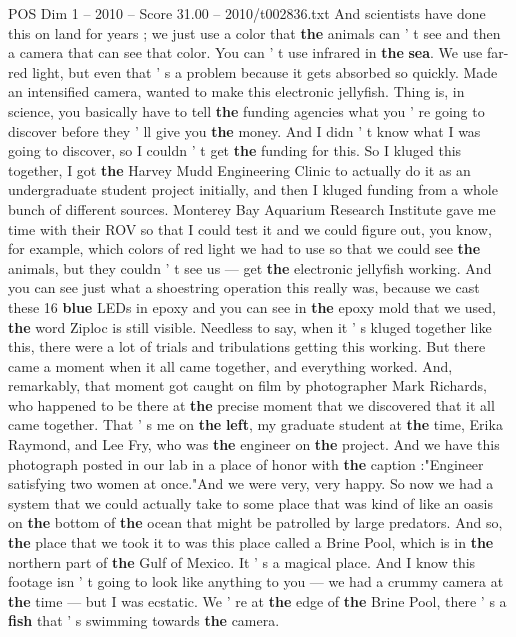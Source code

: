 \begin{textsample}{POS Dim 1 – 2010 – Score 31.00 – 2010/t002836.txt}
And scientists have done this on land for years ; we just use a color that \textbf{the} animals can ' t see and then a camera that can see that color.
You can ' t use infrared in \textbf{the} \textbf{sea}.
We use far-red light, but even that ' s a problem because it gets absorbed so quickly.
Made an intensified camera, wanted to make this electronic jellyfish.
Thing is, in science, you basically have to tell \textbf{the} funding agencies what you ' re going to discover before they ' ll give you \textbf{the} money.
And I didn ' t know what I was going to discover, so I couldn ' t get \textbf{the} funding for this.
So I kluged this together, I got \textbf{the} Harvey Mudd Engineering Clinic to actually do it as an undergraduate student project initially, and then I kluged funding from a whole bunch of different sources.
Monterey Bay Aquarium Research Institute gave me time with their ROV so that I could test it and we could figure out, you know, for example, which colors of red light we had to use so that we could see \textbf{the} animals, but they couldn ' t see us — get \textbf{the} electronic jellyfish working.
And you can see just what a shoestring operation this really was, because we cast these 16 \textbf{blue} LEDs in epoxy and you can see in \textbf{the} epoxy mold that we used, \textbf{the} word Ziploc is still visible.
Needless to say, when it ' s kluged together like this, there were a lot of trials and tribulations getting this working.
But there came a moment when it all came together, and everything worked.
And, remarkably, that moment got caught on film by photographer Mark Richards, who happened to be there at \textbf{the} precise moment that we discovered that it all came together.
That ' s me on \textbf{the} \textbf{left}, my graduate student at \textbf{the} time, Erika Raymond, and Lee Fry, who was \textbf{the} engineer on \textbf{the} project.
And we have this photograph posted in our lab in a place of honor with \textbf{the} caption :"Engineer satisfying two women at once."And we were very, very happy.
So now we had a system that we could actually take to some place that was kind of like an oasis on \textbf{the} bottom of \textbf{the} ocean that might be patrolled by large predators.
And so, \textbf{the} place that we took it to was this place called a Brine Pool, which is in \textbf{the} northern part of \textbf{the} Gulf of Mexico.
It ' s a magical place.
And I know this footage isn ' t going to look like anything to you — we had a crummy camera at \textbf{the} time — but I was ecstatic.
We ' re at \textbf{the} edge of \textbf{the} Brine Pool, there ' s a \textbf{fish} that ' s swimming towards \textbf{the} camera.

\end{textsample}
